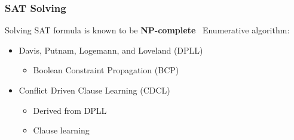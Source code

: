 \documentclass{beamer}
\begin{document}

\begin{frame}
\frametitle{SAT Solving}

	Solving SAT formula is known to be \textbf{NP-complete}~\cite{cook1971complexity}
	\vfill
	Enumerative algorithm:
	\begin{itemize}
		\item Davis, Putnam, Logemann, and Loveland (DPLL)~\cite{dpll_62}
		\begin{itemize}
			\item Boolean Constraint Propagation (BCP)
		\end{itemize}
	\vfill
		\item Conflict Driven Clause Learning (CDCL)~\cite{marques1999grasp}
		\begin{itemize}
			\item Derived from DPLL
			\item Clause learning
		\end{itemize}
	\end{itemize}
	
\end{frame}
%
%
\end{document}
